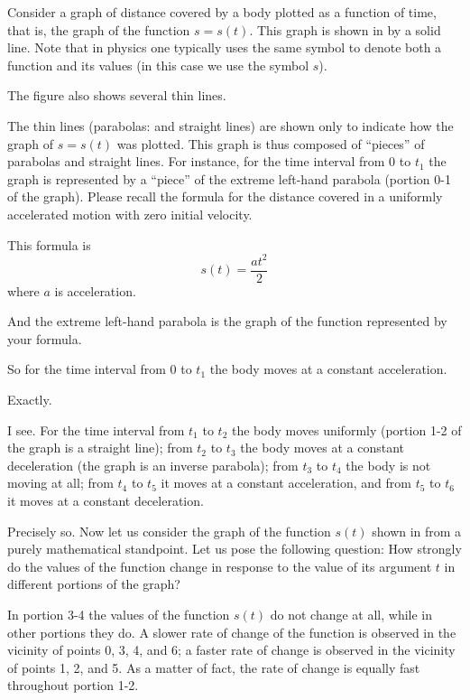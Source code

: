 {\athr Consider a graph of distance covered by a body plotted as a function of time, that is, the graph of the function $s = s (t)$. This graph is shown in  by a solid line. Note that in physics one typically uses the same symbol to denote both a function and its values (in this case we use the symbol $s$).

\rdr The figure also shows several thin lines.

\athr The thin lines (parabolas: and straight lines) are shown only to indicate how the graph of $s = s (t)$ was plotted. This graph is thus composed of ``pieces'' of parabolas and straight lines. For instance, for the time interval from 0 to $t_{1}$ the graph is represented by a ``piece'' of the extreme left-hand parabola (portion 0-1 of the graph). Please recall the formula for the distance covered in a uniformly accelerated motion with zero initial velocity.

\rdr This formula is 
\begin{equation}%
s (t) =\dfrac{at^{2}}{2}
\label{uniform-dist}
\end{equation}
 where $a$ is acceleration. 

\athr And the extreme left-hand parabola is the
graph of the function represented by your formula. 

\rdr So for the time interval from 0 to $t_{1}$ the body moves at a constant acceleration. 

\athr Exactly. 

\rdr I see. For the time interval from $t_{1}$ to $t_{2}$ the
body moves uniformly (portion 1-2 of the graph is a straight line); from $t_{2}$ to $t_{3}$ the body moves at a constant deceleration (the graph is an inverse parabola); from $t_{3}$ to $t_{4}$ the body is not moving at all; from $t_{4}$ to $t_{5}$ it moves at a constant acceleration, and from $t_{5}$ to $t_{6}$ it moves at a constant deceleration.

\athr Precisely so. Now let us consider the graph of the function $s (t)$ shown in  from a purely mathematical standpoint. Let us pose the following question: How strongly do the values of the function change in response
to the value of its argument $t$ in different portions of the graph?

\rdr In portion 3-4 the values of the function $s (t)$ do not change at all, while in other portions they do. A slower rate of change of the function is observed in the vicinity	of	points	0,	3,	4,	and	 6;	a	faster	rate of change is observed in the vicinity of points 1, 2, and 5. As a matter of fact, the rate of change is equally fast throughout portion 1-2.

}
